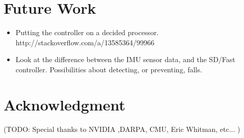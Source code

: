 \documentclass{article}
\begin{document}
\section{Future Work}

\begin{itemize}
\item Putting the controller on a decided processor. http://stackoverflow.com/a/13585364/99966 
\item Look at the difference between the IMU sensor data, and the SD/Fast controller. Possibilities about detecting, or preventing, falls. 
\end{itemize}

\section{Acknowledgment}
(TODO: Special thanks to NVIDIA ,DARPA, CMU, Eric Whitman, etc... ) 






\pagebreak



\end{document}
